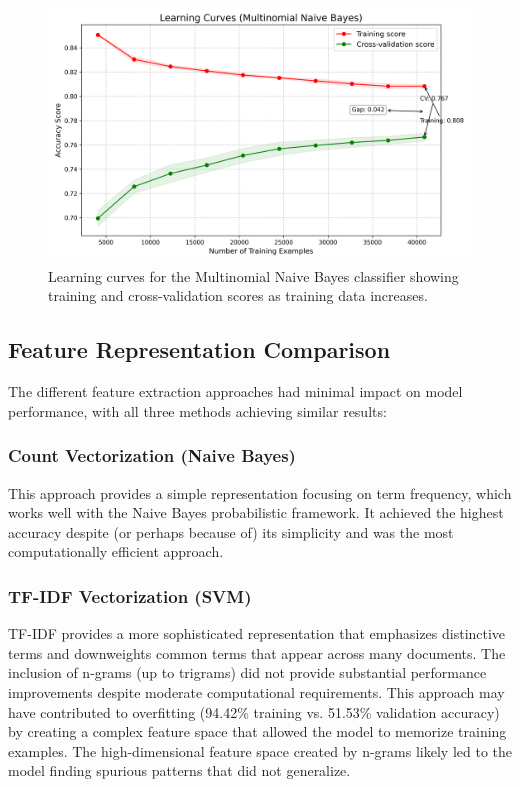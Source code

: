 \documentclass[conference]{IEEEtran}
\begin{document}
\begin{figure}[htbp]
\centerline{\includegraphics[width=0.9\columnwidth]{plots/mnb_learning_curves.png}}
\caption{Learning curves for the Multinomial Naive Bayes classifier showing training and cross-validation scores as training data increases.}
\label{fig:mnb_learning}
\end{figure}

\subsection{Feature Representation Comparison}
The different feature extraction approaches had minimal impact on model performance, with all three methods achieving similar results:

\subsubsection{Count Vectorization (Naive Bayes)}
This approach provides a simple representation focusing on term frequency, which works well with the Naive Bayes probabilistic framework. It achieved the highest accuracy despite (or perhaps because of) its simplicity and was the most computationally efficient approach.

\subsubsection{TF-IDF Vectorization (SVM)}
TF-IDF provides a more sophisticated representation that emphasizes distinctive terms and downweights common terms that appear across many documents. The inclusion of n-grams (up to trigrams) did not provide substantial performance improvements despite moderate computational requirements. This approach may have contributed to overfitting (94.42\% training vs. 51.53\% validation accuracy) by creating a complex feature space that allowed the model to memorize training examples. The high-dimensional feature space created by n-grams likely led to the model finding spurious patterns that did not generalize.
\end{document}
